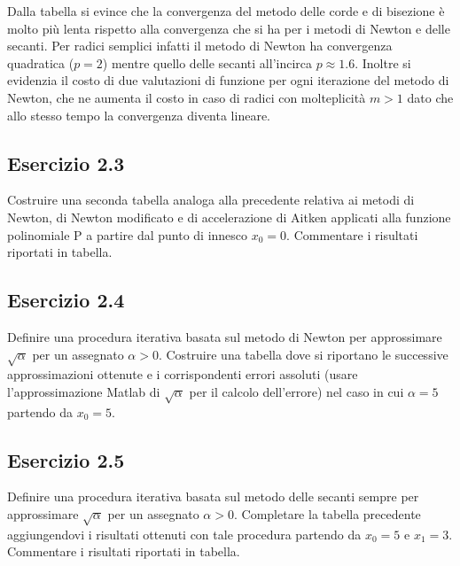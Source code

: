 Dalla tabella si evince che la convergenza del metodo delle corde e di bisezione è molto più lenta rispetto alla convergenza che si ha per i metodi di Newton e delle secanti.
Per radici semplici infatti il metodo di Newton ha convergenza quadratica ($p=2$) mentre quello delle secanti all'incirca $p\approx1.6$. 
Inoltre si evidenzia il costo di due valutazioni di funzione per ogni iterazione del metodo di Newton, che ne aumenta il costo in caso di radici con molteplicità $m > 1$ dato che allo stesso tempo la convergenza diventa lineare.

	\subsection{Esercizio 2.3}

Costruire una seconda tabella analoga alla precedente relativa ai metodi di Newton, di Newton modificato e di accelerazione di Aitken applicati alla funzione polinomiale P a partire dal punto di innesco $x_0 = 0$. Commentare i risultati riportati in tabella.

\TODO



	\subsection{Esercizio 2.4}

Definire una procedura iterativa basata sul metodo di Newton per approssimare $\sqrt{\alpha}$ per un assegnato $\alpha > 0$. Costruire una tabella dove
si riportano le successive approssimazioni ottenute e i corrispondenti errori assoluti (usare l’approssimazione Matlab di $\sqrt{\alpha}$ per il calcolo dell'errore) nel caso in cui $\alpha = 5$ partendo da $x_0 = 5$.

\TODO



	\subsection{Esercizio 2.5}

Definire una procedura iterativa basata sul metodo delle secanti sempre per approssimare $\sqrt{\alpha}$ per un assegnato $\alpha > 0$. Completare la tabella
precedente aggiungendovi i risultati ottenuti con tale procedura partendo da $x_0 = 5$ e $x_1=3$. Commentare i risultati riportati in tabella.

	